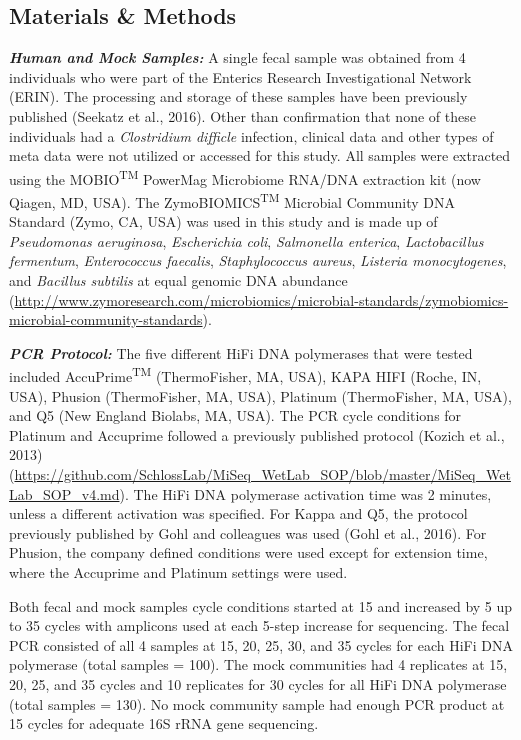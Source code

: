 \documentclass[12pt,]{article}
\begin{document}
\newpage

\subsection{Materials \& Methods}\label{materials-methods}

\textbf{\emph{Human and Mock Samples:}} A single fecal sample was
obtained from 4 individuals who were part of the Enterics Research
Investigational Network (ERIN). The processing and storage of these
samples have been previously published (Seekatz et al., 2016). Other
than confirmation that none of these individuals had a \emph{Clostridium
difficle} infection, clinical data and other types of meta data were not
utilized or accessed for this study. All samples were extracted using
the MOBIO\textsuperscript{TM} PowerMag Microbiome RNA/DNA extraction kit
(now Qiagen, MD, USA). The ZymoBIOMICS\textsuperscript{TM} Microbial
Community DNA Standard (Zymo, CA, USA) was used in this study and is
made up of \emph{Pseudomonas aeruginosa}, \emph{Escherichia coli},
\emph{Salmonella enterica}, \emph{Lactobacillus fermentum},
\emph{Enterococcus faecalis}, \emph{Staphylococcus aureus},
\emph{Listeria monocytogenes}, and \emph{Bacillus subtilis} at equal
genomic DNA abundance
(\url{http://www.zymoresearch.com/microbiomics/microbial-standards/zymobiomics-microbial-community-standards}).

\textbf{\emph{PCR Protocol:}} The five different HiFi DNA polymerases
that were tested included AccuPrime\textsuperscript{TM} (ThermoFisher,
MA, USA), KAPA HIFI (Roche, IN, USA), Phusion (ThermoFisher, MA, USA),
Platinum (ThermoFisher, MA, USA), and Q5 (New England Biolabs, MA, USA).
The PCR cycle conditions for Platinum and Accuprime followed a
previously published protocol (Kozich et al., 2013)
(\url{https://github.com/SchlossLab/MiSeq_WetLab_SOP/blob/master/MiSeq_WetLab_SOP_v4.md}).
The HiFi DNA polymerase activation time was 2 minutes, unless a
different activation was specified. For Kappa and Q5, the protocol
previously published by Gohl and colleagues was used (Gohl et al.,
2016). For Phusion, the company defined conditions were used except for
extension time, where the Accuprime and Platinum settings were used.

Both fecal and mock samples cycle conditions started at 15 and increased
by 5 up to 35 cycles with amplicons used at each 5-step increase for
sequencing. The fecal PCR consisted of all 4 samples at 15, 20, 25, 30,
and 35 cycles for each HiFi DNA polymerase (total samples = 100). The
mock communities had 4 replicates at 15, 20, 25, and 35 cycles and 10
replicates for 30 cycles for all HiFi DNA polymerase (total samples =
130). No mock community sample had enough PCR product at 15 cycles for
adequate 16S rRNA gene sequencing.
\end{document}
